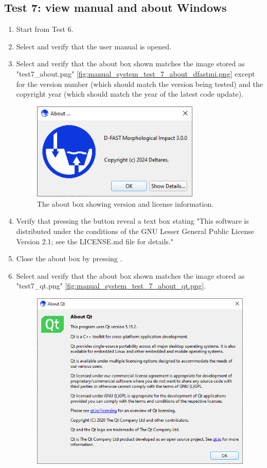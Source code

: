 \subsection{Test 7: view manual and about Windows}
\begin{enumerate}
\item Start from Test 6.
\item Select  \textrightarrow {} and verify that the user manual is opened.
\item Select  \textrightarrow {} and verify that the about box shown matches the image stored as "test7\_about.png" \autoref{fig:manual_system_test_7_about_dfastmi.png} except for the version number (which should match the version being tested) and the copyright year (which should match the year of the latest code update).
\begin{figure}[H]
	\center
	\includegraphics[width=8cm]{figures/manual_system_test_7_about_dfastmi.png}
	\caption{The \dfmi about box showing version and license information.}
	\label{fig:manual_system_test_7_about_dfastmi.png}
\end{figure}
\item Verify that pressing the  button reveal a text box stating "This software is distributed under the conditions of the GNU Lesser General Public License Version 2.1; see the LICENSE.md file for details."
\item Close the about box by pressing .
\item Select  \textrightarrow {} and verify that the about box shown matches the image stored as "test7\_qt.png" \autoref{fig:manual_system_test_7_about_qt.png}.
\begin{figure}[H]
	\center
	\includegraphics[width=12cm]{figures/manual_system_test_7_about_qt.png}

\end{figure}
\end{enumerate}
